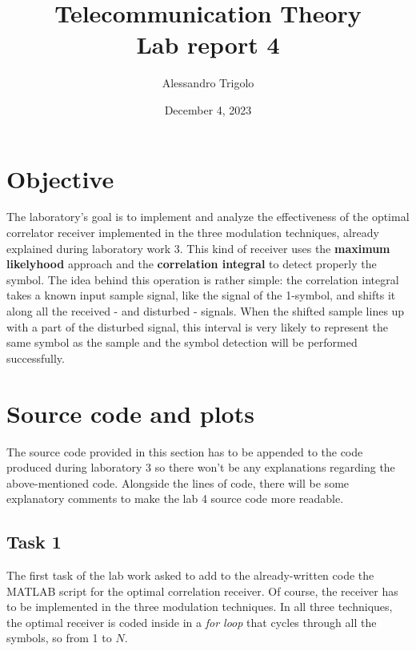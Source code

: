 \title{\vspace{160px} \textbf{\huge{Telecommunication Theory}} \\\vspace{17.5px} \LARGE{Lab report 4}  \vspace{10px}}
\author{Alessandro Trigolo}
\date{December 4, 2023}


\maketitle \newpage

\section*{Objective}
The laboratory's goal is to implement and analyze the effectiveness of the optimal correlator receiver implemented in the three modulation techniques, already explained during laboratory work 3. This kind of receiver uses the \textbf{maximum likelyhood} approach and the \textbf{correlation integral} to detect properly the symbol. The idea behind this operation is rather simple: the correlation integral takes a known input sample signal, like the signal of the 1-symbol, and shifts it along all the received - and disturbed - signals. When the shifted sample lines up with a part of the disturbed signal, this interval is very likely to represent the same symbol as the sample and the symbol detection will be performed successfully.

\section*{Source code and plots}
\lstset{style = MATLAB}
The source code provided in this section has to be appended to the code produced during laboratory 3 so there won't be any explanations regarding the above-mentioned code. Alongside the lines of code, there will be some explanatory comments to make the lab 4 source code more readable.

\subsection*{Task 1}
The first task of the lab work asked to add to the already-written code the MATLAB script for the optimal correlation receiver. Of course, the receiver has to be implemented in the three modulation techniques. In all three techniques, the optimal receiver is coded inside in a \textsl{for loop} that cycles through all the symbols, so from 1 to $N$.

